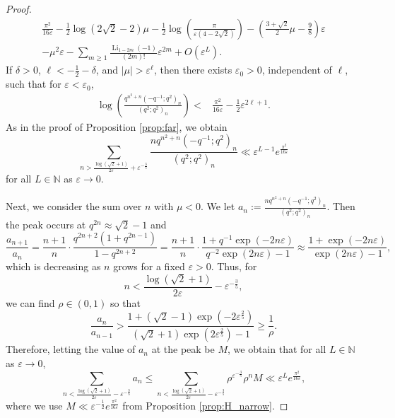 \documentclass[11pt,reqno]{amsart}
\theoremstyle{remark}
\numberwithin{equation}{section}
\def\Li{\operatorname{Li}}
\def\Li{\operatorname{Li}}
\begin{document}
\begin{proof}
\begin{multline*}
	 \frac{\pi^2}{16\varepsilon} -\frac{1}{2}\log(2\sqrt{2}-2)\mu - \frac{1}{2} \log\left(\frac{\pi} {\varepsilon(4-2\sqrt{2})}\right)  - \left(\frac{3+\sqrt{2}}{2}\mu-\frac{9}{8}\right)\varepsilon \\
	 - \mu^2 \varepsilon  -\sum_{m \geq 1} \frac{\Li_{1-2m}(-1)}{(2m)!} \varepsilon^{2m} + O\left(\varepsilon^L\right). 
\end{multline*}
If $\delta>0$, $\ell< -\frac12-\delta$, and $|\mu|>\varepsilon^\ell$, then there exists $\varepsilon_0>0$, independent of $\ell$, such that for $\varepsilon < \varepsilon_0$,
\begin{align*}
	\log\left(\frac{ q^{n^2+n} (-q^{-1};q^2)_n}{(q^2;q^2)_n} \right) <&  \frac{\pi^2}{16\varepsilon} -\frac12 \varepsilon^{2\ell+1}.
\end{align*}
As in the proof of Proposition \ref{prop:far}, we obtain
\[
	\sum_{n > \frac{\log(\sqrt{2}+1) }{2\varepsilon} + \varepsilon^{-\frac35}}  \frac{n q^{n^2+n} (-q^{-1};q^2)_n}{(q^2;q^2)_n}  \ll \varepsilon^{L-1} e^{\frac{\pi^2}{16\varepsilon}}
\]
for all $L \in \mathbb{N}$ as $\varepsilon \to 0$.

Next, we consider the sum over $n$ with $\mu<0$. We let $a_n := \frac{ n q^{n^2+n} (-q^{-1};q^2)_n}{(q^2;q^2)_n}$. Then the peak occurs at $q^{2n} \approx \sqrt{2}-1$ and
\[
	\frac{a_{n+1}}{a_{n}} 
	= \frac{n+1}{n} \cdot \frac{q^{2n+2} (1+ q^{2n-1})}{1- q^{2n+2} } 
	= \frac{n+1}{n} \cdot \frac{1+ q^{-1} \exp(- 2n\varepsilon )}{ q^{-2} \exp (2n\varepsilon) -1 } \approx
	\frac{1+ \exp(- 2n\varepsilon ) }{ \exp (2n\varepsilon) -1 },
\]	
which is decreasing as $n$ grows for a fixed $\varepsilon >0$. Thus, for
\[
	n < \frac{\log(\sqrt{2}+1)}{2\varepsilon} - \varepsilon^{-\frac{3}{5}},
\]
we can find $\rho \in (0,1)$ so that 
\[
	\frac{a_n}{a_{n-1}} > \frac{1 + (\sqrt{2}-1) \exp(-2 \varepsilon^{\frac25} )}{ (\sqrt{2}+1) \exp(2\varepsilon^{\frac25})-1 } \geq \frac{1}{\rho}.
\]
Therefore, letting the value of $a_n$ at the peak be $M$, we obtain that for all $L \in \mathbb{N}$ as $\varepsilon \to 0$,
\[
	\sum_{n < \frac{\log(\sqrt{2}+1) }{2\varepsilon} - \varepsilon^{-\frac35}} a_n 
	\le \sum_{n < \frac{\log(\sqrt{2}+1) }{2\varepsilon} - \varepsilon^{-\frac35}} \rho^{\varepsilon^{-\frac35} } \rho^n M \ll  \varepsilon^{L} e^{\frac{\pi^2}{16\varepsilon}},
\]
where we use $M \ll \varepsilon^{-\frac12} e^{\frac{\pi^2}{16\varepsilon}}$ from Proposition \ref{prop:H_narrow}.
\end{proof}
\end{document}
